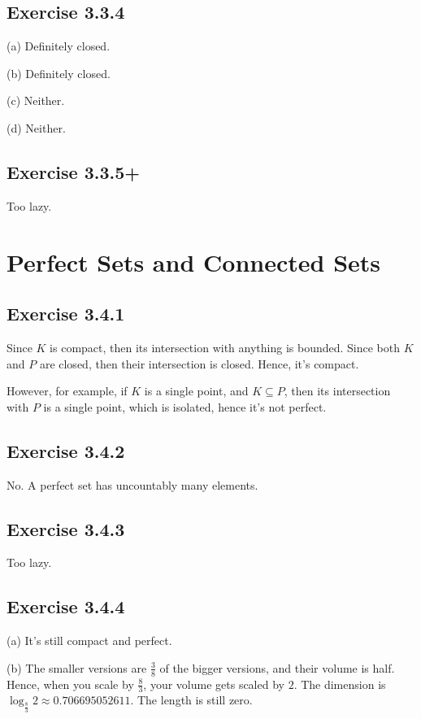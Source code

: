 \documentclass{book}
\begin{document}
\subsection*{Exercise 3.3.4}
(a)
Definitely closed.

\noindent
(b)
Definitely closed.

\noindent
(c)
Neither.

\noindent
(d)
Neither.

\subsection*{Exercise 3.3.5+}
Too lazy.

\section{Perfect Sets and Connected Sets}

\subsection*{Exercise 3.4.1}
Since $K$ is compact, then its intersection with anything is bounded. Since both $K$ and $P$ are closed, then their intersection is closed. Hence, it's compact.

However, for example, if $K$ is a single point, and $K \subseteq P$, then its intersection with $P$ is a single point, which is isolated, hence it's not perfect.

\subsection*{Exercise 3.4.2}
No. A perfect set has uncountably many elements.

\subsection*{Exercise 3.4.3}
Too lazy.

\subsection*{Exercise 3.4.4}
(a)
It's still compact and perfect.

\noindent
(b)
The smaller versions are $\frac{3}{8}$ of the bigger versions, and their volume is half. Hence, when you scale by $\frac{8}{3}$, your volume gets scaled by $2$. The dimension is $\log_{\frac{8}{3}} 2 \approx 0.706695052611$. The length is still zero.
\end{document}
